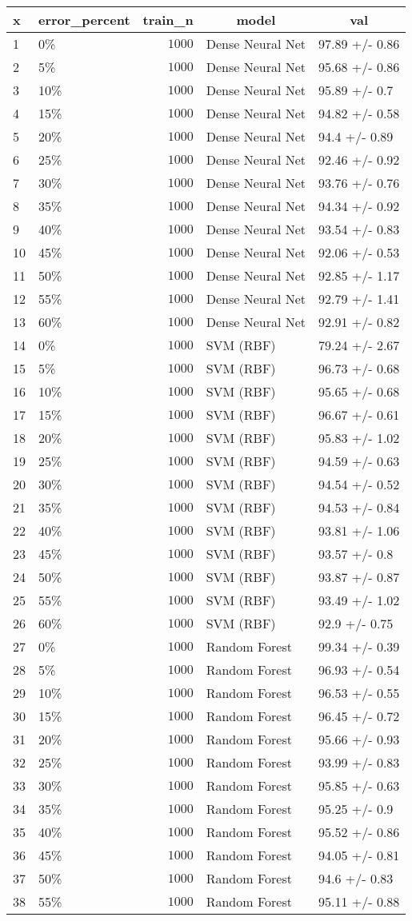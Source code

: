 \begin{table}[!tbp]
\begin{center}
\begin{tabular}{llrll}
\hline\hline
\multicolumn{1}{l}{x}&\multicolumn{1}{c}{error_percent}&\multicolumn{1}{c}{train_n}&\multicolumn{1}{c}{model}&\multicolumn{1}{c}{val}\tabularnewline
\hline
1&0\%&$ 1000$&Dense Neural Net&97.89 +/- 0.86\tabularnewline
2&5\%&$ 1000$&Dense Neural Net&95.68 +/- 0.86\tabularnewline
3&10\%&$ 1000$&Dense Neural Net&95.89 +/- 0.7\tabularnewline
4&15\%&$ 1000$&Dense Neural Net&94.82 +/- 0.58\tabularnewline
5&20\%&$ 1000$&Dense Neural Net&94.4 +/- 0.89\tabularnewline
6&25\%&$ 1000$&Dense Neural Net&92.46 +/- 0.92\tabularnewline
7&30\%&$ 1000$&Dense Neural Net&93.76 +/- 0.76\tabularnewline
8&35\%&$ 1000$&Dense Neural Net&94.34 +/- 0.92\tabularnewline
9&40\%&$ 1000$&Dense Neural Net&93.54 +/- 0.83\tabularnewline
10&45\%&$ 1000$&Dense Neural Net&92.06 +/- 0.53\tabularnewline
11&50\%&$ 1000$&Dense Neural Net&92.85 +/- 1.17\tabularnewline
12&55\%&$ 1000$&Dense Neural Net&92.79 +/- 1.41\tabularnewline
13&60\%&$ 1000$&Dense Neural Net&92.91 +/- 0.82\tabularnewline
14&0\%&$ 1000$&SVM (RBF)&79.24 +/- 2.67\tabularnewline
15&5\%&$ 1000$&SVM (RBF)&96.73 +/- 0.68\tabularnewline
16&10\%&$ 1000$&SVM (RBF)&95.65 +/- 0.68\tabularnewline
17&15\%&$ 1000$&SVM (RBF)&96.67 +/- 0.61\tabularnewline
18&20\%&$ 1000$&SVM (RBF)&95.83 +/- 1.02\tabularnewline
19&25\%&$ 1000$&SVM (RBF)&94.59 +/- 0.63\tabularnewline
20&30\%&$ 1000$&SVM (RBF)&94.54 +/- 0.52\tabularnewline
21&35\%&$ 1000$&SVM (RBF)&94.53 +/- 0.84\tabularnewline
22&40\%&$ 1000$&SVM (RBF)&93.81 +/- 1.06\tabularnewline
23&45\%&$ 1000$&SVM (RBF)&93.57 +/- 0.8\tabularnewline
24&50\%&$ 1000$&SVM (RBF)&93.87 +/- 0.87\tabularnewline
25&55\%&$ 1000$&SVM (RBF)&93.49 +/- 1.02\tabularnewline
26&60\%&$ 1000$&SVM (RBF)&92.9 +/- 0.75\tabularnewline
27&0\%&$ 1000$&Random Forest&99.34 +/- 0.39\tabularnewline
28&5\%&$ 1000$&Random Forest&96.93 +/- 0.54\tabularnewline
29&10\%&$ 1000$&Random Forest&96.53 +/- 0.55\tabularnewline
30&15\%&$ 1000$&Random Forest&96.45 +/- 0.72\tabularnewline
31&20\%&$ 1000$&Random Forest&95.66 +/- 0.93\tabularnewline
32&25\%&$ 1000$&Random Forest&93.99 +/- 0.83\tabularnewline
33&30\%&$ 1000$&Random Forest&95.85 +/- 0.63\tabularnewline
34&35\%&$ 1000$&Random Forest&95.25 +/- 0.9\tabularnewline
35&40\%&$ 1000$&Random Forest&95.52 +/- 0.86\tabularnewline
36&45\%&$ 1000$&Random Forest&94.05 +/- 0.81\tabularnewline
37&50\%&$ 1000$&Random Forest&94.6 +/- 0.83\tabularnewline
38&55\%&$ 1000$&Random Forest&95.11 +/- 0.88\tabularnewline

\end{tabular}
\end{center}
\end{table}
